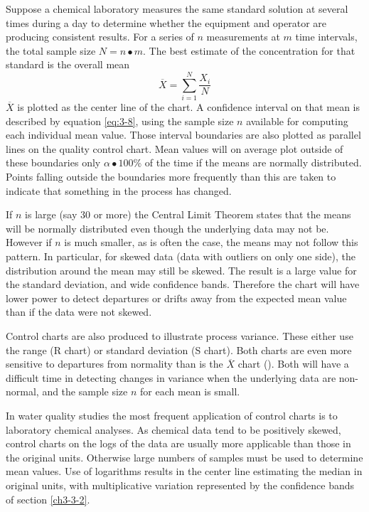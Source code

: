 \documentclass[]{book}
\begin{document}
Suppose a chemical laboratory measures the same standard solution at several times during a day to determine whether the equipment and operator are producing consistent results. For a series of \(n\) measurements at \(m\) time intervals, the total sample size \(N = n \bullet m\). The best estimate of the concentration for that standard is the overall mean \[\overline{X} = \sum_{i=1}^{N} \frac{X_{i}}{N}\] \(\overline{X}\) is plotted as the center line of the chart. A confidence interval on that mean is described by equation \eqref{eq:3-8}, using the sample size \(n\) available for computing each individual mean value. Those interval boundaries are also plotted as parallel lines on the quality control chart. Mean values will on average plot outside of these boundaries only \(\alpha \bullet 100\)\% of the time if the means are normally distributed. Points falling outside the boundaries more frequently than this are taken to indicate that something in the process has changed.

If \(n\) is large (say 30 or more) the Central Limit Theorem states that the means will be normally distributed even though the underlying data may not be. However if \(n\) is much smaller, as is often the case, the means may not follow this pattern. In particular, for skewed data (data with outliers on only one side), the distribution around the mean may still be skewed. The result is a large value for the standard deviation, and wide confidence bands. Therefore the chart will have lower power to detect departures or drifts away from the expected mean value than if the data were not skewed.

Control charts are also produced to illustrate process variance. These either use the range (R chart) or standard deviation (S chart). Both charts are even more sensitive to departures from normality than is the \(\overline{X}\) chart (\citet{montgomery_introduction_1991}). Both will have a difficult time in detecting changes in variance when the underlying data are non-normal, and the sample size \(n\) for each mean is small.

In water quality studies the most frequent application of control charts is to laboratory chemical analyses. As chemical data tend to be positively skewed, control charts on the logs of the data are usually more applicable than those in the original units. Otherwise large numbers of samples must be used to determine mean values. Use of logarithms results in the center line estimating the median in original units, with multiplicative variation represented by the confidence bands of section \ref{ch3-3-2}.
\end{document}
